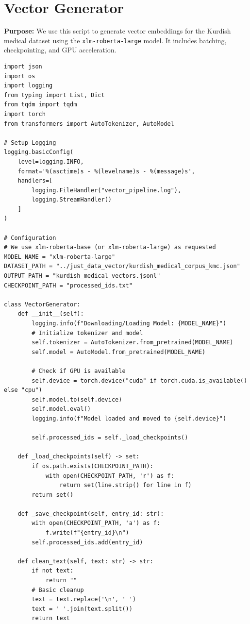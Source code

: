 \documentclass[11pt]{article}
\begin{document}
\clearpage

\section{Vector Generator} \label{sec:generator}
\textbf{Purpose:} We use this script to generate vector embeddings for the Kurdish medical dataset using the \texttt{xlm-roberta-large} model. It includes batching, checkpointing, and GPU acceleration.

\begin{lstlisting}[style=pythoncode, caption={vector\_generator.py}]
import json
import os
import logging
from typing import List, Dict
from tqdm import tqdm
import torch
from transformers import AutoTokenizer, AutoModel

# Setup Logging
logging.basicConfig(
    level=logging.INFO,
    format='%(asctime)s - %(levelname)s - %(message)s',
    handlers=[
        logging.FileHandler("vector_pipeline.log"),
        logging.StreamHandler()
    ]
)

# Configuration
# We use xlm-roberta-base (or xlm-roberta-large) as requested
MODEL_NAME = "xlm-roberta-large"
DATASET_PATH = "../just_data_vector/kurdish_medical_corpus_kmc.json"
OUTPUT_PATH = "kurdish_medical_vectors.jsonl"
CHECKPOINT_PATH = "processed_ids.txt"

class VectorGenerator:
    def __init__(self):
        logging.info(f"Downloading/Loading Model: {MODEL_NAME}")
        # Initialize tokenizer and model
        self.tokenizer = AutoTokenizer.from_pretrained(MODEL_NAME)
        self.model = AutoModel.from_pretrained(MODEL_NAME)
        
        # Check if GPU is available
        self.device = torch.device("cuda" if torch.cuda.is_available() else "cpu")
        self.model.to(self.device)
        self.model.eval()
        logging.info(f"Model loaded and moved to {self.device}")
        
        self.processed_ids = self._load_checkpoints()

    def _load_checkpoints(self) -> set:
        if os.path.exists(CHECKPOINT_PATH):
            with open(CHECKPOINT_PATH, 'r') as f:
                return set(line.strip() for line in f)
        return set()

    def _save_checkpoint(self, entry_id: str):
        with open(CHECKPOINT_PATH, 'a') as f:
            f.write(f"{entry_id}\n")
        self.processed_ids.add(entry_id)

    def clean_text(self, text: str) -> str:
        if not text:
            return ""
        # Basic cleanup
        text = text.replace('\n', ' ')
        text = ' '.join(text.split())
        return text


\end{lstlisting}
\end{document}
